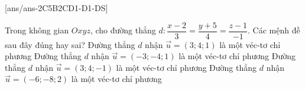 \TNTF
{}[ans/ans-2C5B2CD1-D1-DS]
\begin{ex}%
	Trong không gian $Oxyz$, cho đường thẳng $d \colon \dfrac{x-2}{3}=\dfrac{y+5}{4}=\dfrac{z-1}{-1}$.  Các mệnh đề sau đây đúng hay sai?
\choiceTF
{ Đường thẳng $d$ nhận $\overrightarrow{u}=\left( 3;4;1 \right)$ là một véc-tơ chỉ phương}
{ \True Đường thẳng $d$ nhận $\overrightarrow{u}=\left( -3;-4;1 \right)$ là một véc-tơ chỉ phương}
{\True  Đường thẳng $d$ nhận $\overrightarrow{u}=\left( 3;4;-1 \right)$ là một véc-tơ chỉ phương}
{ \True Đường thẳng $d$ nhận $\overrightarrow{u}=\left( -6;-8;2 \right)$ là một véc-tơ chỉ phương}
\end{ex}
